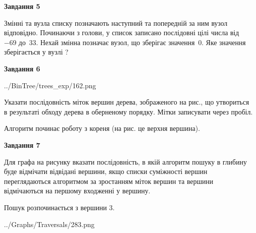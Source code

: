\documentclass[12pt, ukrainian]{article}
\begin{document}
{\begin {large}
{\begin {center}\textbf{Завдання 5}\end {center}}\par
Змінні  та  вузла списку позначають наступний та попередній за ним вузол відповідно. Починаючи з голови, у список записано послідовні цілі числа від~$-69$ до~$33$. Нехай змінна  позначає вузол, що зберігає значення~$0$.
Яке значення зберігається у вузлі  ?\par
\newpage

{\begin {center}\textbf{Завдання 6}\end {center}}\par

\begin{center}
	{../BinTree/trees_exp/162.png}
\end{center}
Указати послідовність міток вершин дерева, зображеного на рис., що утвориться в результаті обходу дерева в оберненому порядку. Мітки записувати через пробіл.\par Алгоритм починає роботу з кореня (на рис. це верхня вершина).\par
\newpage

{\begin {center}\textbf{Завдання 7}\end {center}}\par
Для графа на рисунку вказати послідовність, в якій алгоритм пошуку в глибину буде відмічати відвідані вершини, якщо списки суміжності вершин переглядаються алгоритмом за зростанням міток вершин та вершини відмічаються на першому вход\-женні у вершину.\par
Пошук розпочинається з вершини 3.\par

\begin{center}
	{../Graphs/Traversals/283.png}
\end{center}\par
\newpage


\end{large}}
\end{document}

